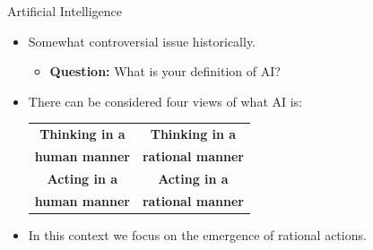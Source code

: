 \documentclass[%
pdf,
colorBG,
slideColor,
tcrico,
]{prosper}
\begin{document}
\begin{slide}{Artificial Intelligence}
\begin{itemize}
 \item  Somewhat controversial issue historically.
	\begin{itemize}
	\item \textbf{Question:} What is your definition of AI? 
	\end{itemize}
 \item There can be considered four views of what AI is:
	\begin{center}
	\begin{tabular}{c||c}
	\rowcolor[HTML]{aabbcc}\textbf{Thinking in a } & \textbf{Thinking in a} \\
	\rowcolor[HTML]{aabbcc}\textbf{human manner} & \textbf{rational manner}\\ \hline \hline
	\rowcolor[HTML]{aabbcc}\textbf{Acting in a } & \textbf{Acting in a} \\
	\rowcolor[HTML]{aabbcc}\textbf{human manner} & \textbf{rational manner}\\ 
	\end{tabular}
	\end{center}
 \item In this context we focus on the emergence of rational actions.
\end{itemize}
\end{slide}

\end{document}
